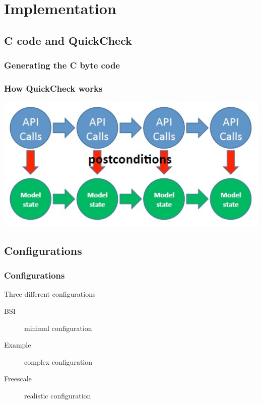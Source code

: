\documentclass{beamer}
\begin{document}
\section{Implementation}
\subsection{C code and QuickCheck}
\begin{frame}
  \frametitle{Generating the C byte code}
  
\end{frame}


%   


\begin{frame}
  \frametitle{How QuickCheck works}
  \centerline{
    \includegraphics[keepaspectratio, width=0.7\linewidth]{api_calls}
  }
\end{frame}

\subsection{Configurations}

\begin{frame}
  \frametitle{Configurations}
  Three different configurations\\
  \begin{description}
    \item[BSI] minimal configuration
    \item[Example] complex configuration
    \item[Freescale] realistic configuration
  \end{description}
\end{frame}
\end{document}
